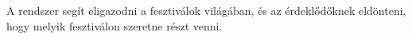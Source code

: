 

A rendszer segít eligazodni a fesztiválok világában, és az érdeklődőknek eldönteni, hogy melyik fesztiválon szeretne részt venni.
